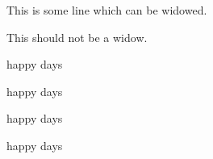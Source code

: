 



\vsize=1.4in
\raggedbottom

\leavevmode

This is some line which can be widowed.

\goodbreak
This should not be a widow.

\ex
happy days\par
happy days\par
happy days\par
happy days\par
\xe

\bye

